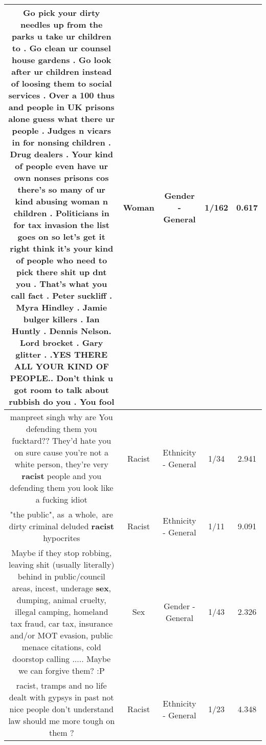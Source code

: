 \documentclass[11pt]{article}
\newlength\mylength
\begin{document}
\begin{center}
\begin{longtable}{|C{.65\mylength}|C{.30\mylength}|C{.12\mylength}|C{.12\mylength}|C{.12\mylength}|}
  \small Go pick your dirty needles up from the parks u take ur children to . Go clean ur counsel house gardens . Go look after ur children instead of loosing them to social services . Over a 100 thus and people in  UK prisons alone guess what there ur people . Judges n vicars in for nonsing  children .  Drug dealers  .  Your kind of people even have ur own nonses prisons cos there's so many of ur kind abusing \textbf{woman} n children .  Politicians in for tax invasion the list goes on so let's get it right think it's your kind of people who need to pick there shit up dnt you .   That's what you call fact  .  Peter suckliff  . Myra Hindley . Jamie bulger killers . Ian Huntly  . Dennis Nelson.  Lord brocket . Gary glitter . .YES THERE ALL YOUR KIND OF PEOPLE.. Don't think u got room to talk about rubbish do you . You fool\normalsize   & Woman & Gender - General & 1/162 & 0.617 \\  \hline
  \small manpreet singh why are You defending them you fucktard?? They'd hate you on sure cause you're not a white person, they're  very \textbf{racist} people and you defending them you look like a fucking idiot\normalsize   & Racist & Ethnicity - General & 1/34 & 2.941 \\  \hline
  \small "the public", as a whole, are dirty criminal deluded \textbf{racist} hypocrites\normalsize   & Racist & Ethnicity - General & 1/11 & 9.091 \\  \hline
  \small Maybe if they stop robbing, leaving shit (usually literally) behind in public/council areas,  incest, underage \textbf{sex}, dumping, animal cruelty, illegal camping, homeland tax fraud, car tax, insurance and/or MOT evasion, public menace citations, cold doorstop calling ..... Maybe we can forgive them? :P\normalsize   & Sex & Gender - General & 1/43 & 2.326 \\  \hline
  \small racist, tramps and no life dealt with gypsys in past not nice people don't understand law should me more tough on them ?\normalsize   & Racist & Ethnicity - General & 1/23 & 4.348 \\  \hline

\end{longtable}
\end{center}
\end{document}
